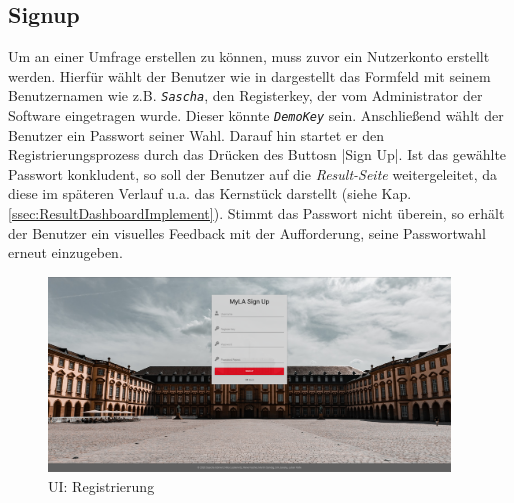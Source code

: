 \subsection{Signup}
\label{ssec:Signup}

Um an einer Umfrage erstellen zu können, muss zuvor ein Nutzerkonto erstellt werden. 
Hierfür wählt der Benutzer wie in \abb {} dargestellt das Formfeld mit seinem Benutzernamen wie z.B. \emph{\texttt{Sascha}}, den Registerkey, der vom Administrator der Software eingetragen wurde. Dieser könnte \emph{\texttt{DemoKey}} sein.
Anschließend wählt der Benutzer ein Passwort seiner Wahl.
Darauf hin startet er den Registrierungsprozess durch das Drücken des Buttosn \jinline|Sign Up|.
Ist das gewählte Passwort konkludent, so soll der Benutzer auf die \emph{Result-Seite} weitergeleitet, da diese im späteren Verlauf u.a. das Kernstück darstellt (siehe Kap. \vref{ssec:ResultDashboardImplement}). 
Stimmt das Passwort nicht überein, so erhält der Benutzer ein visuelles Feedback mit der Aufforderung, seine Passwortwahl erneut einzugeben. 

\begin{figure}[hp]
	\centering
	\includegraphics[width=0.95\textwidth, keepaspectratio]{img/client/Signup.png}
	\captionsetup{justification=centering, format=plain}
	\caption[\acf{UI}: Registrierung]{\acf{UI}: Registrierung \\ \quelleScreenshot}
	\label{fig:SignupImplement}
\end{figure}